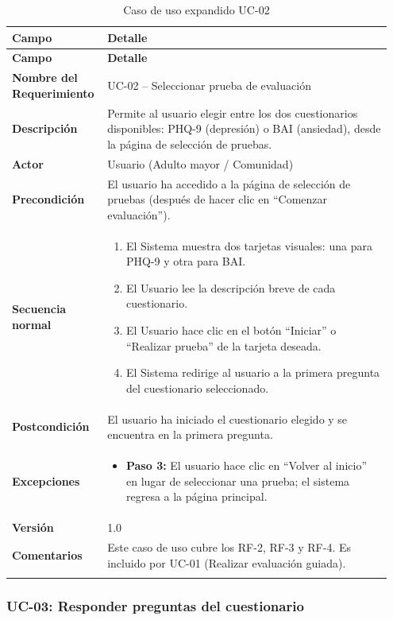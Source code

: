 \begin{longtable}{p{0.22\linewidth} p{0.73\linewidth}}
\toprule
\rowcolor{tableheader!20}
\textbf{Campo} & \textbf{Detalle} \\
\midrule
\endfirsthead
\rowcolor{tableheader!20}
\textbf{Campo} & \textbf{Detalle} \\
\midrule
\endhead
\bottomrule
\endfoot
\textbf{Nombre del Requerimiento} & UC-02 -- Seleccionar prueba de evaluación \\
\textbf{Descripción} & Permite al usuario elegir entre los dos cuestionarios disponibles: PHQ-9 (depresión) o BAI (ansiedad), desde la página de selección de pruebas. \\
\textbf{Actor} & Usuario (Adulto mayor / Comunidad) \\
\textbf{Precondición} & El usuario ha accedido a la página de selección de pruebas (después de hacer clic en ``Comenzar evaluación''). \\
\textbf{Secuencia normal} & 
  \begin{enumerate}
    \item El Sistema muestra dos tarjetas visuales: una para PHQ-9 y otra para BAI.
    \item El Usuario lee la descripción breve de cada cuestionario.
    \item El Usuario hace clic en el botón ``Iniciar'' o ``Realizar prueba'' de la tarjeta deseada.
    \item El Sistema redirige al usuario a la primera pregunta del cuestionario seleccionado.
  \end{enumerate} \\
\textbf{Postcondición} & El usuario ha iniciado el cuestionario elegido y se encuentra en la primera pregunta. \\
\textbf{Excepciones} & 
  \begin{itemize}
    \item \textbf{Paso 3:} El usuario hace clic en ``Volver al inicio'' en lugar de seleccionar una prueba; el sistema regresa a la página principal.
  \end{itemize} \\
\textbf{Versión} & 1.0 \\
\textbf{Comentarios} & Este caso de uso cubre los RF-2, RF-3 y RF-4. Es incluido por UC-01 (Realizar evaluación guiada). \\
\bottomrule
\caption{Caso de uso expandido UC-02}
\label{tab:uc02}
\end{longtable}

\subsubsection{UC-03: Responder preguntas del cuestionario}

